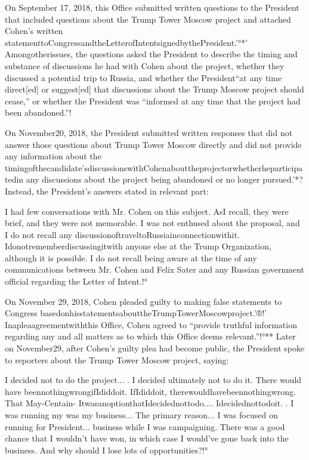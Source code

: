On September 17, 2018, this Office submitted written questions to the President that included questions about the Trump Tower Moscow project and attached Cohen's written statementtoCongressandtheLetterofIntentsignedbythePresident.'°*' Amongotherissues, the questions asked the President to describe the timing and substance of discussions he had with Cohen about the project, whether they discussed a potential trip to Russia, and whether the President“at any time direct[ed] or suggest[ed] that discussions about the Trump Moscow project should cease,” or whether the President was “informed at any time that the project had been abandoned.”!%

On November20, 2018, the President submitted written responses that did not answer those questions about Trump Tower Moscow directly and did not provide any information about the timingofthecandidate'sdiscussionswithCohenabouttheprojectorwhetherheparticipatedin any discussions about the project being abandoned or no longer pursued.'*? Instead, the President's answers stated in relevant part:

I had few conversations with Mr. Cohen on this subject. AsI recall, they were brief, and they were not memorable. I was not enthused about the proposal, and I do not recall any discussionoftraveltoRussiainconnectionwithit. Idonotrememberdiscussingitwith anyone else at the Trump Organization, although it is possible. I do not recall being aware at the time of any communications between Mr. Cohen and Felix Sater and any Russian government official regarding the Letter of Intent.!°

On November 29, 2018, Cohen pleaded guilty to making false statements to Congress basedonhisstatementsabouttheTrumpTowerMoscowproject.'®!' Inapleaagreementwiththis Office, Cohen agreed to “provide truthful information regarding any and all matters as to which this Office deems relevant.”!°** Later on November29, after Cohen's guilty plea had become public, the President spoke to reporters about the Trump Tower Moscow project, saying:

I decided not to do the project... . I decided ultimately not to do it. There would have beennothingwrongifIdiddoit. IfIdiddoit, therewouldhavebeennothingwrong. That
May-Centain-
ItwasanoptionthatIdecidednottodo.... Idecidednottodoit. . I was running my
was my business...
The primary reason... I was focused on running for President...
business while I was campaigning. There was a good chance that I wouldn't have won, in which case I would've gone back into the business. And why should I lose lots of opportunities?!°

